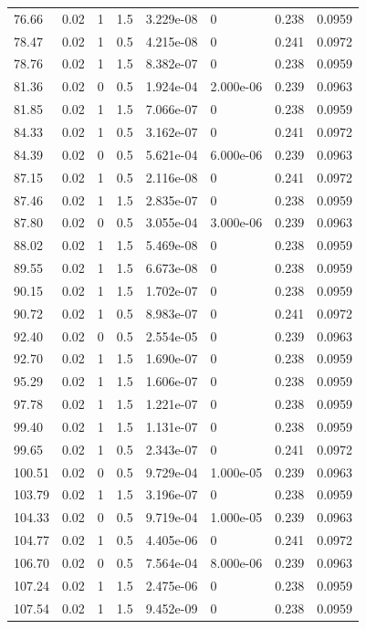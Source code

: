 \documentclass[preview]{standalone}
\begin{document}
{{{\begin{tabular}{L{1.2cm}C{1.2cm} C{0.3cm}C{0.5cm} C{1.4cm}C{1.4cm} C{1.4cm}C{1.4cm}}
  76.66  &  0.02  & 1     & 1.5 &  3.229e-08  & 0  & 0.238 &  0.0959   \\ 
  78.47  &  0.02  & 1     & 0.5 &  4.215e-08  & 0  & 0.241 &  0.0972   \\ 
  78.76  &  0.02  & 1     & 1.5 &  8.382e-07  & 0  & 0.238 &  0.0959   \\ 
  81.36  &  0.02  & 0     & 0.5 &  1.924e-04  & 2.000e-06  & 0.239 &  0.0963   \\ 
  81.85  &  0.02  & 1     & 1.5 &  7.066e-07  & 0  & 0.238 &  0.0959   \\ 
  84.33  &  0.02  & 1     & 0.5 &  3.162e-07  & 0  & 0.241 &  0.0972   \\ 
  84.39  &  0.02  & 0     & 0.5 &  5.621e-04  & 6.000e-06  & 0.239 &  0.0963   \\ 
  87.15  &  0.02  & 1     & 0.5 &  2.116e-08  & 0  & 0.241 &  0.0972   \\ 
  87.46  &  0.02  & 1     & 1.5 &  2.835e-07  & 0  & 0.238 &  0.0959   \\ 
  87.80  &  0.02  & 0     & 0.5 &  3.055e-04  & 3.000e-06  & 0.239 &  0.0963   \\ 
  88.02  &  0.02  & 1     & 1.5 &  5.469e-08  & 0  & 0.238 &  0.0959   \\ 
  89.55  &  0.02  & 1     & 1.5 &  6.673e-08  & 0  & 0.238 &  0.0959   \\ 
  90.15  &  0.02  & 1     & 1.5 &  1.702e-07  & 0  & 0.238 &  0.0959   \\ 
  90.72  &  0.02  & 1     & 0.5 &  8.983e-07  & 0  & 0.241 &  0.0972   \\ 
  92.40  &  0.02  & 0     & 0.5 &  2.554e-05  & 0  & 0.239 &  0.0963   \\ 
  92.70  &  0.02  & 1     & 1.5 &  1.690e-07  & 0  & 0.238 &  0.0959   \\ 
  95.29  &  0.02  & 1     & 1.5 &  1.606e-07  & 0  & 0.238 &  0.0959   \\ 
  97.78  &  0.02  & 1     & 1.5 &  1.221e-07  & 0  & 0.238 &  0.0959   \\ 
  99.40  &  0.02  & 1     & 1.5 &  1.131e-07  & 0  & 0.238 &  0.0959   \\ 
  99.65  &  0.02  & 1     & 0.5 &  2.343e-07  & 0  & 0.241 &  0.0972   \\ 
  100.51  &  0.02  & 0     & 0.5 &  9.729e-04  & 1.000e-05  & 0.239 &  0.0963   \\ 
  103.79  &  0.02  & 1     & 1.5 &  3.196e-07  & 0  & 0.238 &  0.0959   \\ 
  104.33  &  0.02  & 0     & 0.5 &  9.719e-04  & 1.000e-05  & 0.239 &  0.0963   \\ 
  104.77  &  0.02  & 1     & 0.5 &  4.405e-06  & 0  & 0.241 &  0.0972   \\ 
  106.70  &  0.02  & 0     & 0.5 &  7.564e-04  & 8.000e-06  & 0.239 &  0.0963   \\ 
  107.24  &  0.02  & 1     & 1.5 &  2.475e-06  & 0  & 0.238 &  0.0959   \\ 
  107.54  &  0.02  & 1     & 1.5 &  9.452e-09  & 0  & 0.238 &  0.0959   \\ 
\hline 
\end{tabular} 

}}}
\end{document}
